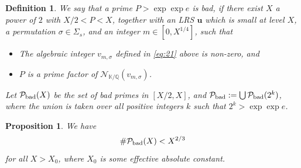\documentclass[preprint,12pt]{elsarticle}
\newtheorem{definition}[theorem]{Definition}
\newtheorem{proposition}[theorem]{Proposition}
\begin{document}
\begin{definition} 
  We say that a prime $P > \exp \exp e$ is bad, if there exist $X$ a
  power of $2$ with $X/2 < P < X$, together with an LRS
  $\mathbf{u}$ which is small at level $X$,
  a permutation $\sigma\in \Sigma_s$, and an integer $m\in [0,X^{1/4}]$, such that 
\begin{itemize}
\item The algebraic integer $v_{m,\sigma}$ defined in \eqref{eq:21} above is non-zero, and 
\item $P$ is a prime factor of ${\mathcal N}_{{\mathbb K}/{\mathbb Q}} (v_{m,\sigma})$.
\end{itemize}
Let ${\mathcal P}_{\text{\rm bad}}(X)$ be the set of bad primes in
$[X/2,X]$, and 
${\mathcal P}_{\text{\rm bad}} := \bigcup {\mathcal P}_{\text{\rm
      bad}}(2^k)$,
where the union is taken over all positive integers $k$ such that 
$2^k>\exp \exp e$.
\end{definition}

\begin{proposition}
\label{prop:density}  
We have 
\[
\# {\mathcal P}_{\text{\rm bad}}(X)<X^{2/3}
\]
for all $X>X_0$, where $X_0$ is some effective absolute constant. 
\end{proposition}
\end{document}
